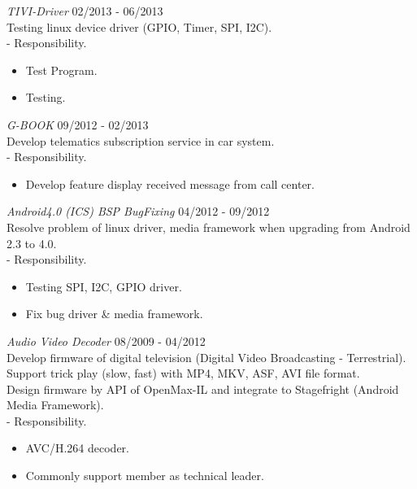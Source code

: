 \documentclass[margin]{res}
\begin{document}
\begin{resume}
                {\sl TIVI-Driver} \hfill            02/2013 - 06/2013 \\
		 Testing linux device driver (GPIO, Timer, SPI, I2C).\\
		 - Responsibility.
                 \begin{itemize}  \itemsep -2pt %
                 \item Test Program.
                 \item Testing.
                 \end{itemize}

                {\sl G-BOOK} \hfill            09/2012 - 02/2013 \\
		 Develop telematics subscription service in car system.\\
		 - Responsibility.
                 \begin{itemize}  \itemsep -2pt %
                 \item Develop feature display received message from call center.
                 \end{itemize}

                {\sl Android4.0 (ICS) BSP BugFixing} \hfill            04/2012 - 09/2012\\
		 Resolve problem of linux driver, media framework when upgrading from Android 2.3 to 4.0.\\
		 - Responsibility.
                 \begin{itemize}  \itemsep -2pt %
                 \item Testing SPI, I2C, GPIO driver.
                 \item Fix bug driver \& media framework.
                 \end{itemize}

                {\sl Audio Video Decoder} \hfill            08/2009 - 04/2012 \\
                 Develop firmware of digital television (Digital Video Broadcasting - Terrestrial).\\
                 Support trick play (slow, fast) with MP4, MKV, ASF, AVI file format.\\
                 Design firmware by API of OpenMax-IL and integrate to Stagefright (Android Media Framework).\\
		 - Responsibility.
                 \begin{itemize}  \itemsep -2pt %
                 \item AVC/H.264 decoder.
                 \item Commonly support member as technical leader.
        	 \end{itemize}



\end{resume}
\end{document}
